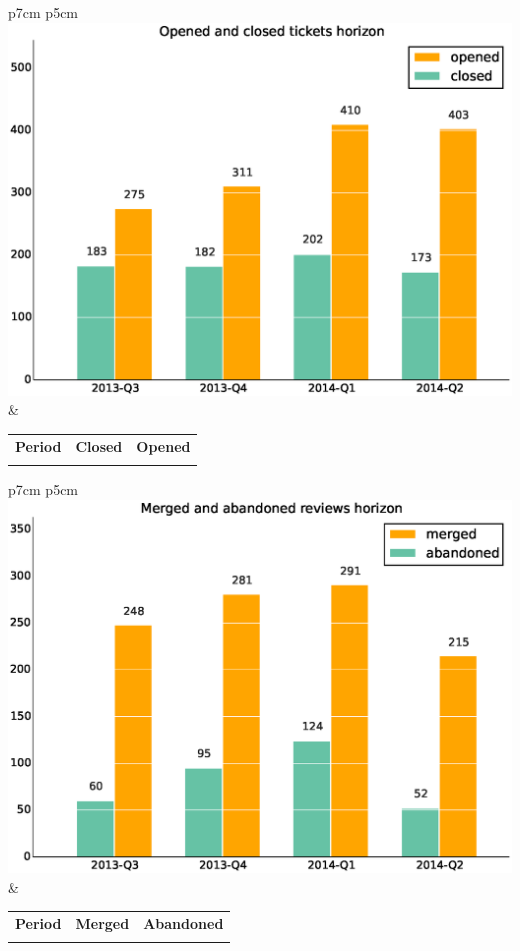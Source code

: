 \documentclass[a4wide,11pt]{report}
\begin{document}
\begin{tabular}{p{7cm} p{5cm}}
    \vspace{0pt} 
    \includegraphics[scale=.35]{figs/closedhorizon.eps}
    & 
    \vspace{0pt}
    \begin{tabular}{l|r|r|}%
\bfseries Period & \bfseries Closed & \bfseries Opened
    \csvreader[head to column names]{data/closedhorizon.csv}{}%
    {\\ & \closed & \opened}
    \end{tabular}
\end{tabular}

\begin{tabular}{p{7cm} p{5cm}}
    \vspace{0pt} 
    \includegraphics[scale=.35]{figs/submitted_reviewshorizon.eps}
    & 
    \vspace{0pt}
    \begin{tabular}{l|r|r|}%
    \bfseries Period & \bfseries Merged & \bfseries Abandoned %
    \csvreader[head to column names]{data/submitted_reviewshorizon.csv}{}%
    {\\ & \merged & \abandoned}
    \end{tabular}
\end{tabular}
\end{document}

